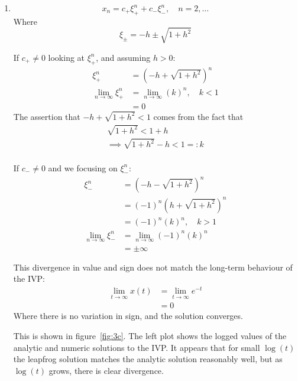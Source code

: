 \documentclass{X:/Documents/Coding/Latex/myassignment}
\begin{document}
\begin{enumerate}
\begin{enumerate}
		\item %
		\[x_n = c_+ \xi_+^n + c_- \xi_-^n, \quad n=2,\ldots\]
		Where
		\[\xi_\pm = -h \pm \sqrt{1+h^2}\]


		If $c_+ \neq 0$ looking at $\xi_+^n$, and assuming $h > 0$:
		\begin{align*}
			\xi_+^n  &= \left(-h+ \sqrt{1+h^2}\right)^n\\ 
			\lim_{n\to\infty} \xi_+^n&=  \lim_{n\to\infty} (k)^n, \quad k < 1\\
			&= 0
		\end{align*}
		The assertion that $-h+\sqrt{1+h^2} <1$ comes from the fact that
		\begin{align*}
		 	\sqrt{1+h^2} < 1 + h\\
		 	\implies \sqrt{1+h^2} - h < 1 =: k\\	
		\end{align*} 


		If $c_- \neq 0$ and we focusing on $\xi_-^n$:
		\begin{align*}
			\xi_-^n  &= \left(-h- \sqrt{1+h^2}\right)^n\\ 
			&= (-1)^n \left(h +\sqrt{1+h^2}\right)^n \\
			&= (-1)^n (k)^n, \quad k > 1\\
			\lim_{n\to\infty} \xi_-^n &= \lim_{n\to\infty}(-1)^n (k)^n\\
			&= \pm \infty
		\end{align*}


		This divergence in value and sign does not match the long-term behaviour of the IVP:
		\begin{align*}
		 	\lim_{t\to\infty} x(t) &= \lim_{t\to\infty} e^{-t}\\
		 	&= 0
	 	\end{align*} 
	 	Where there is no variation in sign, and the solution converges.

	 	This is shown in figure~\ref{fig:3c}. The left plot shows the logged values of the analytic and numeric solutions to the IVP. It appears that for small $\log(t)$ the leapfrog solution matches the analytic solution reasonably well, but as $\log(t)$ grows, there is clear divergence.


\end{enumerate}
\end{enumerate}
\end{document}
